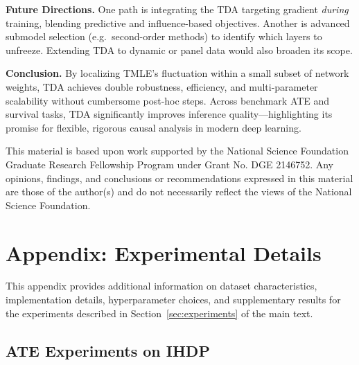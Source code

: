 \documentclass{article}
\theoremstyle{remark}
\begin{document}
\noindent\textbf{Future Directions.}
One path is integrating the TDA targeting gradient \emph{during} training, blending predictive and influence-based objectives. Another is advanced submodel selection (e.g.\ second-order methods) to identify which layers to unfreeze. Extending TDA to dynamic or panel data would also broaden its scope.

\noindent\textbf{Conclusion.}
By localizing TMLE’s fluctuation within a small subset of network weights, TDA achieves double robustness, efficiency, and multi-parameter scalability without cumbersome post-hoc steps. Across benchmark ATE and survival tasks, TDA significantly improves inference quality—highlighting its promise for flexible, rigorous causal analysis in modern deep learning. 



\begin{ack}

This material is based upon work supported by the National Science Foundation Graduate Research Fellowship Program under Grant No. DGE 2146752. Any opinions, findings, and conclusions or recommendations expressed in this material are those of the author(s) and do not necessarily reflect the views of the National Science Foundation.

\end{ack}

\medskip




\newpage
\appendix

\section{Appendix: Experimental Details}
\label{app}
This appendix provides additional information on dataset characteristics, implementation details, hyperparameter choices, and supplementary results for the experiments described in Section~\ref{sec:experiments} of the main text.
\subsection{ATE Experiments on IHDP}
\label{app:ATE_IHDP}
\end{document}
